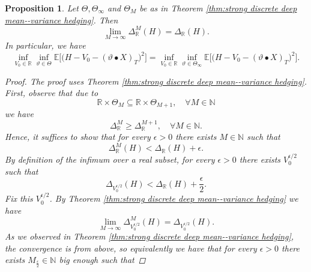 \documentclass[11pt,a4paper,twoside,openany]{report}
\numberwithin{equation}{section}
\theoremstyle{plain} %
\newtheorem{proposition}[theorem]{Proposition}
\theoremstyle{definition} %
\theoremstyle{remark} %
\begin{document}
\begin{proposition}\label{prop:finite deep mean--variance hedging with variable V0}
    Let \(\Theta,\Theta_{\infty}\) and \(\Theta_M\) be as in Theorem \ref{thm:strong discrete deep mean--variance hedging}. Then
    \begin{equation*}
        \lim_{M\to\infty}\Delta_{\mathbb{R}}^M(H)=\Delta_{\mathbb{R}}(H).
    \end{equation*}
 In particular, we have 
    \begin{equation*}
    \inf_{V_0\in\mathbb{R}}\inf_{\vartheta\in\Theta}\mathbb{E}\Big[\big(H-V_0-(\vartheta\bullet X)_T\big)^2\Big]=\inf_{V_0\in\mathbb{R}}\inf_{\vartheta\in\Theta_{\infty}}\mathbb{E}\Big[\big(H-V_0-(\vartheta\bullet X)_T\big)^2\Big].
    \end{equation*}
    \begin{proof}
        The proof uses Theorem \ref{thm:strong discrete deep mean--variance hedging}. First, observe that due to 
        \begin{equation*}
            \mathbb{R}\times\Theta_M\subseteq \mathbb{R}\times\Theta_{M+1},\quad\forall M\in\mathbb{N}
        \end{equation*}
        we have
        \begin{equation*}
            \Delta_{\mathbb{R}}^M\geq \Delta_{\mathbb{R}}^{M+1},\quad\forall M\in\mathbb{N}.
        \end{equation*}
        Hence, it suffices to show that for every \(\epsilon>0\) there exists \(M\in\mathbb{N}\) such that 
        \begin{equation*}
           \Delta_{\mathbb{R}}^M(H)< \Delta_{\mathbb{R}}(H)+\epsilon.
        \end{equation*}
        By definition of the infimum over a real subset, for every \(\epsilon>0\) there exists \(V_0^{\epsilon/2}\) such that 
        \begin{equation*}
        \Delta_{V_0^{\epsilon/2}}(H)<\Delta_{\mathbb{R}}(H)+\frac{\epsilon}{2}.
        \end{equation*}
        Fix this \(V_0^{\epsilon/2}\). By Theorem \ref{thm:strong discrete deep mean--variance hedging} we have
        \begin{equation*}
            \lim_{M\to\infty}\Delta_{V_0^{\epsilon/2}}^M(H)=\Delta_{V_0^{\epsilon/2}}(H).
        \end{equation*}
        As we observed in Theorem \ref{thm:strong discrete deep mean--variance hedging}, the convergence is from above, so equivalently we have that for every \(\epsilon>0\) there exists \(M_{\frac{\epsilon}{2}}\in\mathbb{N}\) big enough such that

\end{proof}
\end{proposition}
\end{document}
